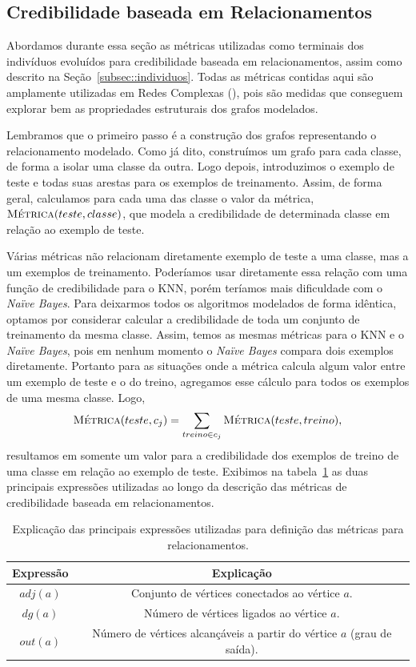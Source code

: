 
\subsection{Credibilidade baseada em Relacionamentos}
\label{sec::pg_cred_baseada_grafos}

Abordamos durante essa seção as métricas utilizadas como terminais dos indivíduos evoluídos para credibilidade baseada em relacionamentos, assim como descrito na Seção~\ref{subsec::individuos}. Todas as métricas contidas aqui são amplamente utilizadas em Redes Complexas (\cite{Newman03}), pois são medidas que conseguem explorar bem as propriedades estruturais dos grafos modelados.

Lembramos que o primeiro passo é a construção dos grafos representando o relacionamento modelado. 
Como já dito, construímos um grafo para cada classe, de forma a isolar uma classe da outra.
Logo depois, introduzimos o exemplo de teste e todas suas arestas para os exemplos de treinamento. Assim, de forma geral, calculamos para cada uma das classe o valor da métrica, $\textsc{Métrica}(teste, classe)$, que modela a credibilidade de determinada classe em relação ao exemplo de teste. 

Várias métricas não relacionam diretamente exemplo de teste a uma classe, mas a um exemplos de treinamento. 
Poderíamos usar diretamente essa relação com uma função de credibilidade para o \textsc{KNN}, porém teríamos mais dificuldade com o \textit{Naïve Bayes}. Para deixarmos todos os algoritmos modelados de forma idêntica, optamos por considerar calcular a credibilidade de toda um conjunto de treinamento da mesma classe. Assim, temos as mesmas métricas para o \textsc{KNN} e o \textit{Naïve Bayes}, pois em nenhum momento o \textit{Naïve Bayes} compara dois exemplos diretamente.
Portanto para as situações onde a métrica calcula algum valor entre um exemplo de teste e o do treino, agregamos esse cálculo para todos os exemplos de uma mesma classe. Logo,
\begin{equation}
         \textsc{Métrica}(teste, c_j) =  \sum\limits_{treino \in c_j} \textsc{Métrica}(teste, treino),
\end{equation}
resultamos em somente um valor para a credibilidade dos exemplos de treino de uma classe em relação ao exemplo de teste.
Exibimos na tabela~\ref{table::metricas_rel} as duas principais expressões utilizadas ao longo da descrição das métricas de credibilidade baseada em relacionamentos.

\begin{table}[ht*]
\centering
\caption{Explicação das principais expressões utilizadas para definição das métricas para relacionamentos.}
\label{table::metricas_rel}
\begin{tabular}{|c|c|}
\toprule
    \textbf{Expressão} & \textbf{Explicação} \\
\midrule
    $adj(a)$           & Conjunto de vértices conectados ao vértice $a$. \tabularnewline \hline
    $dg(a)$            & Número de vértices ligados ao vértice $a$.\tabularnewline \hline
    $out(a)$           & Número de vértices alcançáveis a partir do vértice $a$ (grau de saída).\tabularnewline \hline
\bottomrule
\end{tabular}
\end{table}

